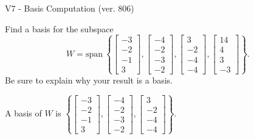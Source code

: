 \begin{exercise}
  \begin{exerciseTitle}V7 - Basis Computation (ver. 806)\end{exerciseTitle}
  \begin{exerciseStatement}
    Find a basis for the subspace 
\[W=\mathrm{span}\ \left\{\left[\begin{array}{r}
-3 \\
-2 \\
-1 \\
3
\end{array}\right] , \left[\begin{array}{r}
-4 \\
-2 \\
-3 \\
-2
\end{array}\right] , \left[\begin{array}{r}
3 \\
-2 \\
-4 \\
-4
\end{array}\right] , \left[\begin{array}{r}
14 \\
4 \\
3 \\
-3
\end{array}\right]\right\}.\]
 Be sure to explain why your result is a basis.


  \end{exerciseStatement}
  \begin{exerciseAnswer}
   A basis of \(W\) is  \(\left\{\left[\begin{array}{r}
-3 \\
-2 \\
-1 \\
3
\end{array}\right] , \left[\begin{array}{r}
-4 \\
-2 \\
-3 \\
-2
\end{array}\right] , \left[\begin{array}{r}
3 \\
-2 \\
-4 \\
-4
\end{array}\right]\right\}\).
  


  \end{exerciseAnswer}
\end{exercise}
